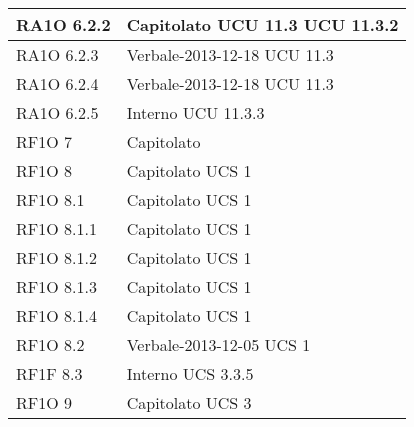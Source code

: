 \begin{center}
\begin{longtable}{ | p{5cm} | p{5cm} |}
        RA1O 6.2.2 &  Capitolato \newline  UCU 11.3 \newline  UCU 11.3.2 \newline  \\ \hline      
        RA1O 6.2.3 &  Verbale-2013-12-18 \newline  UCU 11.3 \newline  \\ \hline      
        RA1O 6.2.4 &  Verbale-2013-12-18 \newline  UCU 11.3 \newline  \\ \hline      
        RA1O 6.2.5 &  Interno \newline  UCU 11.3.3 \newline  \\ \hline      
        RF1O 7 &  Capitolato \newline  \\ \hline      
        RF1O 8 &  Capitolato \newline  UCS 1 \newline  \\ \hline      
        RF1O 8.1  &  Capitolato \newline  UCS 1 \newline  \\ \hline      
        RF1O 8.1.1 &  Capitolato \newline  UCS 1 \newline  \\ \hline      
        RF1O 8.1.2 &  Capitolato \newline  UCS 1 \newline  \\ \hline      
        RF1O 8.1.3 &  Capitolato \newline  UCS 1 \newline  \\ \hline      
        RF1O 8.1.4 &  Capitolato \newline  UCS 1 \newline  \\ \hline      
        RF1O 8.2 &  Verbale-2013-12-05 \newline  UCS 1 \newline  \\ \hline      
        RF1F 8.3 &  Interno \newline  UCS 3.3.5 \newline  \\ \hline      
        RF1O 9 &  Capitolato \newline  UCS 3 \newline  \\ \hline      

\end{longtable}
\end{center}
